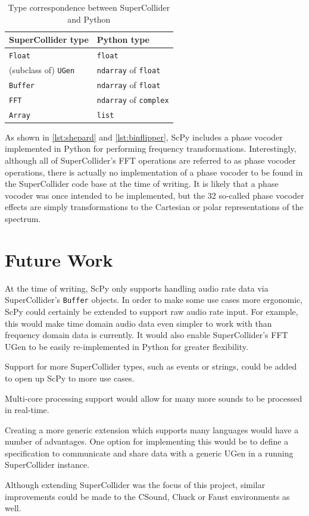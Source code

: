 \documentclass{article}
\begin{document}
\begin{table}[H]
    \caption{Type correspondence between SuperCollider and Python}
    \begin{center}
        \begin{tabular}{ll}
            \toprule
            SuperCollider type & Python type \\
            \midrule
            \texttt{Float} & \texttt{float} \\
            (subclass of) \texttt{UGen} & \texttt{ndarray} of \texttt{float} \\
            \texttt{Buffer} & \texttt{ndarray} of \texttt{float} \\
            \texttt{FFT} & \texttt{ndarray} of \texttt{complex} \\
            \texttt{Array} & \texttt{list} \\
            \bottomrule
        \end{tabular}
    \end{center}
\end{table}

As shown in \autoref{lst:shepard} and \autoref{lst:binflipper}, ScPy includes a phase vocoder
implemented in Python for performing frequency transformations. Interestingly, although all of
SuperCollider's FFT operations are referred to as phase vocoder operations, there is actually no
implementation of a phase vocoder to be found in the SuperCollider code base at the time of
writing. It is likely that a phase vocoder was once intended to be implemented, but the 32
so-called phase vocoder effects are simply transformations to the Cartesian or polar
representations of the spectrum.

\section{Future Work}

At the time of writing, ScPy only supports handling audio rate data via SuperCollider's
\texttt{Buffer} objects. In order to make some use cases more ergonomic, ScPy could certainly be
extended to support raw audio rate input. For example, this would make time domain audio data even
simpler to work with than frequency domain data is currently. It would also enable SuperCollider's
FFT UGen to be easily re-implemented in Python for greater flexibility.

Support for more SuperCollider types, such as events or strings, could be added to open up ScPy to
more use cases.

Multi-core processing support would allow for many more sounds to be processed in real-time.

Creating a more generic extension which supports many languages would have a number of advantages.
One option for implementing this would be to define a specification to communicate and share data
with a generic UGen in a running SuperCollider instance.

Although extending SuperCollider was the focus of this project, similar improvements could be made
to the CSound\cite{boulanger2000csound,lazzarini2005extensions}, Chuck\cite{wang2008chuck} or
Faust\cite{orlarey2009faust} environments as well.

\printbibliography{}
\end{document}

